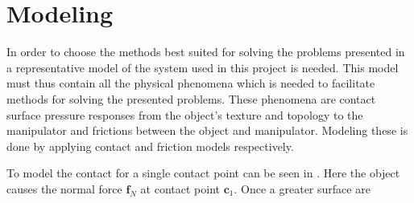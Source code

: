 
\chapter{Modeling} \label{ch:modeling}

In order to choose the methods best suited for solving the problems presented in  a representative model of the system used in this project is needed. This model must thus contain all the physical phenomena which is needed to facilitate methods for solving the presented problems. These phenomena are contact surface pressure responses from the object's texture and topology to the manipulator and frictions between the object and manipulator. Modeling these is done by applying contact and friction models respectively. \medskip

To model the contact for a single contact point can be seen in . Here the object causes the normal force $\mathbf{f}_N$ at contact point $\mathbf{c}_1$. Once a greater surface are


